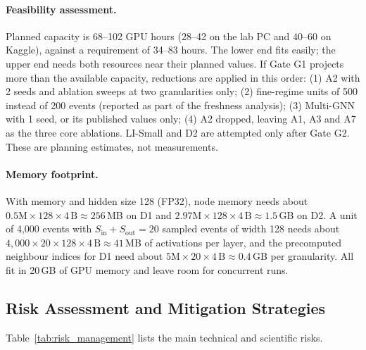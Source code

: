 \documentclass[11pt,a4paper]{article}
\begin{document}
\paragraph{Feasibility assessment.} Planned capacity is 68--102 GPU hours (28--42 on the lab PC and 40--60 on Kaggle), against a requirement of 34--83 hours. The lower end fits easily; the upper end needs both resources near their planned values. If Gate G1 projects more than the available capacity, reductions are applied in this order: (1) A2 with 2 seeds and ablation sweeps at two granularities only; (2) fine-regime units of 500 instead of 200 events (reported as part of the freshness analysis); (3) Multi-GNN with 1 seed, or its published values only; (4) A2 dropped, leaving A1, A3 and A7 as the three core ablations. LI-Small and D2 are attempted only after Gate G2. These are planning estimates, not measurements.

\paragraph{Memory footprint.} With memory and hidden size 128 (FP32), node memory needs about $0.5\text{M}\times128\times4\,\text{B}\approx256$\,MB on D1 and $2.97\text{M}\times128\times4\,\text{B}\approx1.5$\,GB on D2. A unit of 4,000 events with $S_{\text{in}}+S_{\text{out}}=20$ sampled events of width 128 needs about $4{,}000\times20\times128\times4\,\text{B}\approx41$\,MB of activations per layer, and the precomputed neighbour indices for D1 need about $5\text{M}\times20\times4\,\text{B}\approx0.4$\,GB per granularity. All fit in 20\,GB of GPU memory and leave room for concurrent runs.

\subsection{Risk Assessment and Mitigation Strategies}
Table~\ref{tab:risk_management} lists the main technical and scientific risks.
\end{document}
